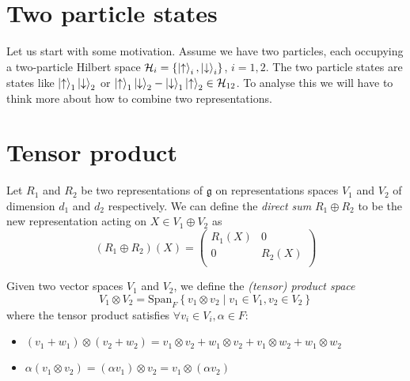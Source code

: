 \section*{Two particle states}%

Let us start with some motivation.
Assume we have two particles, each occupying a two-particle Hilbert space $\mathcal{H}_i = \left\{ \ket{\uparrow}_i, \ket{\downarrow}_i \right\}$, $i = 1, 2$.
The two particle states are states like $\ket{\uparrow}_1 \ket{\downarrow}_2$ or $\ket{\uparrow}_1 \ket{\downarrow}_2 - \ket{\downarrow}_1 \ket{\uparrow}_2 \in \mathcal{H}_{12}$.
To analyse this we will have to think more about how to combine two representations.

\section{Tensor product}%
\label{sec:tensor_product}

\begin{definition}[]
  Let $R_1$ and $R_2$ be two representations of $\mathfrak{g}$ on representations spaces $V_1$ and $V_2$ of dimension $d_1$ and $d_2$ respectively.
  We can define the \emph{direct sum} $R_1 \oplus R_2$ to be the new representation acting on $X \in V_1 \oplus V_2$ as
  \begin{equation}
    (R_1 \oplus R_2)(X) = 
    \begin{pmatrix}
      R_1(X) & 0 \\
      0 & R_2(X) \\
    \end{pmatrix}
  \end{equation}
\end{definition}

\begin{definition}[]
  Given two vector spaces $V_1$ and $V_2$, we define the \emph{(tensor) product space}
  \begin{equation}
    V_1 \otimes V_2 = \text{Span}_F \left\{ v_1 \otimes v_2 \mid v_1 \in V_1, v_2 \in V_2 \right\}
  \end{equation}
  where the tensor product satisfies $\forall v_i \in V_i, \alpha \in F$:
  \begin{itemize}
    \item $(v_1 + w_1) \otimes (v_2 + w_2) = v_1 \otimes v_2 + w_1 \otimes v_2 + v_1 \otimes w_2 + w_1 \otimes w_2$
    \item $\alpha(v_1 \otimes v_2) = (\alpha v_1) \otimes v_2 = v_1 \otimes (\alpha v_2)$
  \end{itemize}
\end{definition}

